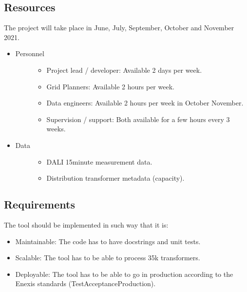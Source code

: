 \documentclass[letterpaper,10pt,english]{sphinxmanual}
\begin{document}
\subsection{Resources}
\label{\detokenize{business_understanding:resources}}
The project will take place in June, July, September, October and November 2021.
\begin{itemize}
\item {} \begin{description}
\item[{Personnel}] \leavevmode\begin{itemize}
\item {} 
Project lead / developer: Available 2 days per week.

\item {} 
Grid Planners: Available 2 hours per week.

\item {} 
Data engineers: Available 2 hours per week in October \sphinxhyphen{} November.

\item {} 
Supervision / support: Both available for a few hours every 3 weeks.

\end{itemize}

\end{description}

\item {} \begin{description}
\item[{Data}] \leavevmode\begin{itemize}
\item {} 
DALI 15\sphinxhyphen{}minute measurement data.

\item {} 
Distribution transformer metadata (capacity).

\end{itemize}

\end{description}

\end{itemize}


\subsection{Requirements}
\label{\detokenize{business_understanding:requirements}}
The tool should be implemented in such way that it is:
\begin{itemize}
\item {} 
Maintainable: The code has to have docstrings and unit tests.

\item {} 
Scalable: The tool has to be able to process 35k transformers.

\item {} 
Deployable: The tool has to be able to go in production according to the Enexis standards (Test\sphinxhyphen{}Acceptance\sphinxhyphen{}Production).

\end{itemize}
\end{document}
